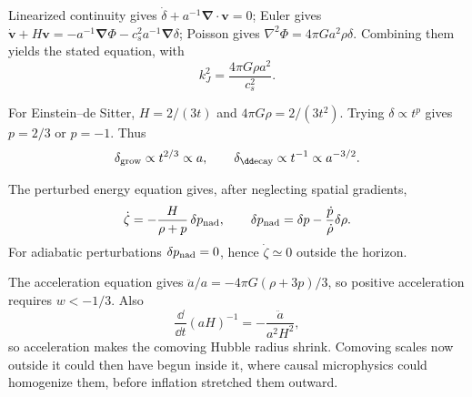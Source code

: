 \begin{solutions}
\begin{solution}
Linearized continuity gives
\(\dot\delta+a^{-1}\bm\nabla\cdot\bm v=0\); Euler gives
\(\dot{\bm v}+H\bm v=-a^{-1}\bm\nabla\Phi
-c_s^2a^{-1}\bm\nabla\delta\); Poisson gives
\(\nabla^2\Phi=4\pi Ga^2\rho\delta\).  Combining them yields the stated
equation, with
\[
k_J^2=\frac{4\pi G\rho a^2}{c_s^2}.
\]
\end{solution}

\begin{solution}
For Einstein--de Sitter,
\(H=2/(3t)\) and \(4\pi G\rho=2/(3t^2)\).  Trying
\(\delta\propto t^p\) gives
\(p=2/3\) or \(p=-1\).  Thus
\[
\delta_{\rm grow}\propto t^{2/3}\propto a,\qquad
\delta_{\rm \dd ecay}\propto t^{-1}\propto a^{-3/2}.
\]
\end{solution}

\begin{solution}
The perturbed energy equation gives, after neglecting spatial gradients,
\[
\dot\zeta
=-\frac{H}{\rho+p}\,\delta p_{\rm nad},
\qquad
\delta p_{\rm nad}=\delta p-\frac{\dot p}{\dot\rho}\delta\rho.
\]
For adiabatic perturbations \(\delta p_{\rm nad}=0\), hence
\(\dot\zeta\simeq0\) outside the horizon.
\end{solution}

\begin{solution}
The acceleration equation gives
\(\ddot a/a=-4\pi G(\rho+3p)/3\), so positive acceleration requires
\(w<-1/3\).  Also
\[
\frac{\dd}{\dd t}(aH)^{-1}
=-\frac{\ddot a}{a^2H^2},
\]
so acceleration makes the comoving Hubble radius shrink.  Comoving scales
now outside it could then have begun inside it, where causal microphysics
could homogenize them, before inflation stretched them outward.
\end{solution}



\end{solutions}

